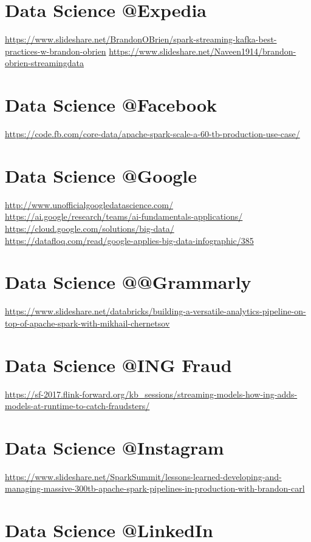 \documentclass[12pt, numbers=noenddot]{scrreprt} %
\begin{document}
\section{Data Science @Expedia}
\url{https://www.slideshare.net/BrandonOBrien/spark-streaming-kafka-best-practices-w-brandon-obrien}
\url{https://www.slideshare.net/Naveen1914/brandon-obrien-streamingdata}

\section{Data Science @Facebook}
\url{https://code.fb.com/core-data/apache-spark-scale-a-60-tb-production-use-case/}

\section{Data Science @Google}		
\url{http://www.unofficialgoogledatascience.com/} \\		
\url{https://ai.google/research/teams/ai-fundamentals-applications/} \\		
\url{https://cloud.google.com/solutions/big-data/} \\		
\url{https://datafloq.com/read/google-applies-big-data-infographic/385}

\section{Data Science @@Grammarly}
\url{https://www.slideshare.net/databricks/building-a-versatile-analytics-pipeline-on-top-of-apache-spark-with-mikhail-chernetsov}

\section{Data Science @ING Fraud}
\url{https://sf-2017.flink-forward.org/kb_sessions/streaming-models-how-ing-adds-models-at-runtime-to-catch-fraudsters/}

\section{Data Science @Instagram}
\url{https://www.slideshare.net/SparkSummit/lessons-learned-developing-and-managing-massive-300tb-apache-spark-pipelines-in-production-with-brandon-carl}

\section{Data Science @LinkedIn}
\end{document}
